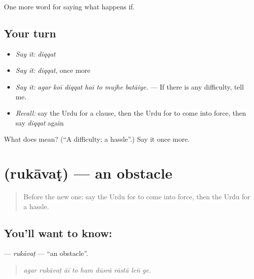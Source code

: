 \begin{grammarlens}[title={What you've built}]
One more word for saying what happens if.
\end{grammarlens}

\subsection*{Your turn}
\begin{itemize}
\raggedright
  \item \emph{Say it:} \emph{diqqat}
  \item \emph{Say it:} \emph{diqqat}, once more
  \item \emph{Say it:} \emph{agar koī diqqat hai to mujhe batāiye.} — If there is any difficulty, tell me.
  \item \emph{Recall:} say the Urdu for a clause, then the Urdu for to come into force, then say \emph{diqqat} again
\end{itemize}

\begin{tcolorbox}[breakable,colback=teal!4,colframe=teal!35!black,title={Before you move on}]
What does  mean? (\textquotedblleft{}A difficulty; a hassle\textquotedblright{}.) Say it once more.
\end{tcolorbox}
\section[\texorpdfstring{\ur{رکاوٹ} (rukāvaṭ)}{رکاوٹ (rukāvaṭ)}]{ (rukāvaṭ) — an obstacle}

\label{lesson:UR-C368-rukavat}



\begin{quote}
Before the new one: say the Urdu for to come into force, then the Urdu for a hassle.
\end{quote}

\subsection*{You'll want to know: }
\textbf{} — \emph{rukāvaṭ} — \textquotedblleft{}an obstacle\textquotedblright{}.

\begin{quote}
        
\end{quote}

\begin{quote}
\emph{agar rukāvaṭ āī to ham dūsrā rāstā leṅ ge.}
\end{quote}

